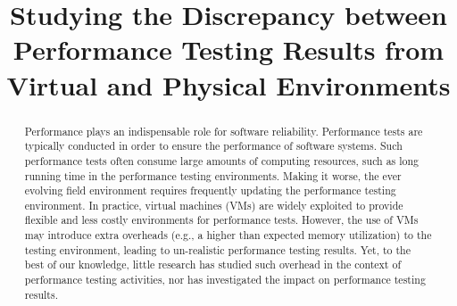 \documentclass[10pt, conference]{IEEEtran}
\begin{document}
\title{Studying the Discrepancy between Performance Testing Results from Virtual and Physical Environments}

\author{

}

\maketitle

\begin{abstract}
Performance plays an indispensable role for software reliability. 
Performance tests are typically conducted in order to ensure the performance of software systems. Such performance tests often consume large amounts of computing resources, such as long running time in the performance testing environments. Making it worse, the ever evolving field environment requires frequently updating the performance testing environment. In practice, virtual machines (VMs) are widely exploited to provide flexible and less costly environments for performance tests. However, the use of VMs may introduce extra overheads (e.g., a higher than expected memory utilization) to the testing environment, leading to un-realistic performance testing results. Yet, to the best of our knowledge, little research has studied such overhead in the context of performance testing activities, nor has investigated the impact on performance testing results. 
		

\end{abstract}
\end{document}
